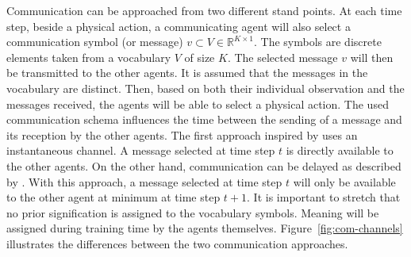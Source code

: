 Communication can be approached from two different stand points. At each time step, beside a physical action, a communicating agent will also select a communication symbol (or message) $v \subset V \in \mathbb{R} ^{K \times 1}$. The symbols are discrete elements taken from a vocabulary $V$ of size $K$. The selected message $v$ will then be transmitted to the other agents. It is assumed that the messages in the vocabulary are distinct. Then, based on both their individual observation and the messages received, the agents will be able to select a physical action. The used communication schema influences the time between the sending of a message and its reception by the other agents. The first approach inspired by \cite{mordatch_emergence_2017} uses an instantaneous channel. A message selected at time step $t$ is directly available to the other agents. On the other hand, communication can be delayed as described by \cite{foerster_learning_2016}. With this approach, a message selected at time step $t$ will only be available to the other agent at minimum at time step $t+1$. It is important to stretch that no prior signification is assigned to the vocabulary symbols. Meaning will be assigned during training time by the agents themselves. Figure~\ref{fig:com-channels} illustrates the differences between the two communication approaches. 

